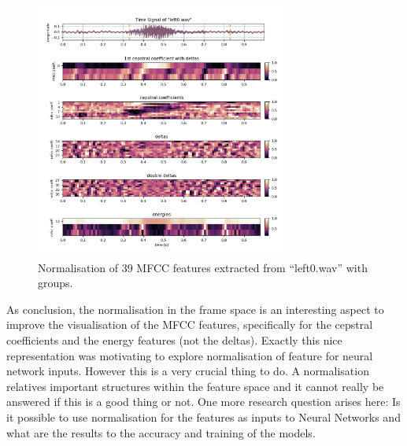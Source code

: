 \begin{figure}[!ht]
  \centering
    \includegraphics[width=0.75\textwidth]{./3_signal/figs/signal_mfcc_left0_order_norm1.png}
  \caption{Normalisation of 39 MFCC features extracted from \enquote{left0.wav} with groups.}
  \label{fig:left0_order_norm1}
\end{figure}
\FloatBarrier
\noindent
As conclusion, the normalisation in the frame space is an interesting aspect to improve the visualisation of the MFCC features, 
specifically for the cepstral coefficients and the energy features (not the deltas).
Exactly this nice representation was motivating to explore normalisation of feature for neural network inputs.
However this is a very crucial thing to do. A normalisation relatives important structures within the feature space and it cannot really be answered if this is a good thing or not.
One more research question arises here: Is it possible to use normalisation for the features as inputs to Neural Networks and what are the results to the accuracy and training of the models.
